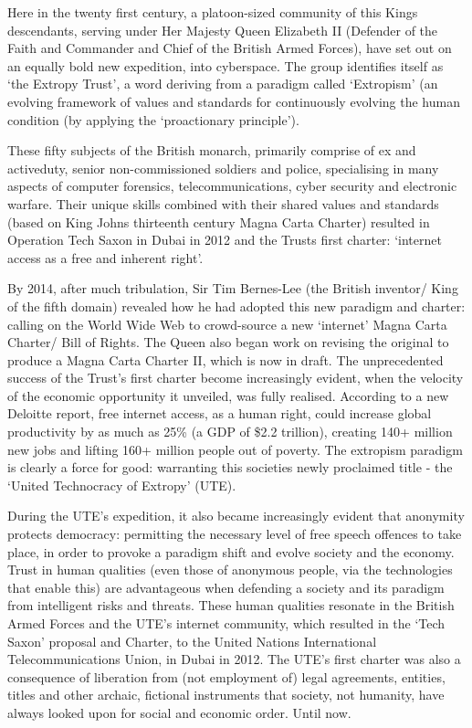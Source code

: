 \documentclass[letterpaper,10pt,openany,oneside,english]{sphinxmanual}
\begin{document}
Here in the twenty first century, a platoon-sized community of this Kings descendants, serving under Her Majesty Queen Elizabeth II (Defender of the Faith and Commander and Chief of the British Armed Forces), have set out on an equally bold new expedition, into cyberspace. The group identifies itself as ‘the Extropy Trust’, a word deriving from a paradigm called ‘Extropism’ (an evolving framework of values and standards for continuously evolving the human condition (by applying the ‘proactionary principle’).

These fifty subjects of the British monarch, primarily comprise of ex and activeduty, senior non-commissioned soldiers and police, specialising in many aspects of computer forensics, telecommunications, cyber security and electronic warfare. Their unique skills combined with their shared values and standards (based on King Johns thirteenth century Magna Carta Charter) resulted in Operation Tech Saxon in Dubai in 2012 and the Trusts first charter: ‘internet access as a free and inherent right’.

By 2014, after much tribulation, Sir Tim Bernes-Lee (the British inventor/ King of the fifth domain) revealed how he had adopted this new paradigm and charter: calling on the World Wide Web to crowd-source a new ‘internet’ Magna Carta Charter/ Bill of Rights. The Queen also began work on revising the original to produce a Magna Carta Charter II, which is now in draft. The unprecedented success of the Trust’s first charter become increasingly evident, when the velocity of the economic opportunity it unveiled, was fully realised. According to a new Deloitte report, free internet access, as a human right, could increase global productivity by as much as 25\% (a GDP of \$2.2 trillion), creating 140+ million new jobs and lifting 160+ million people out of poverty. The extropism paradigm is clearly a force for good: warranting this societies newly proclaimed title - the ‘United Technocracy of Extropy’ (UTE).

During the UTE’s expedition, it also became increasingly evident that anonymity protects democracy: permitting the necessary level of free speech offences to take place, in order to provoke a paradigm shift and evolve society and the economy. Trust in human qualities (even those of anonymous people, via the technologies that enable this) are advantageous when defending a society and its paradigm from intelligent risks and threats. These human qualities resonate in the British Armed Forces and the UTE’s internet community, which resulted in the ‘Tech Saxon’ proposal and Charter, to the United Nations International Telecommunications Union, in Dubai in 2012. The UTE’s first charter was also a consequence of liberation from (not employment of) legal agreements, entities, titles and other archaic, fictional instruments that society, not humanity, have always looked upon for social and economic order. Until now.
\end{document}
